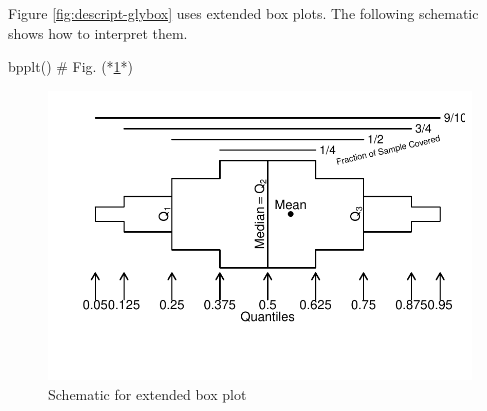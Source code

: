 Figure \ref{fig:descript-glybox} uses extended box plots.  The
following schematic shows how to interpret them.
\begin{Schunk}
\begin{Sinput}
bpplt()   # Fig. (*\ref{fig:descript-bpplt}*)
\end{Sinput}
\begin{figure}[htbp]

\centerline{\includegraphics[width=\maxwidth]{descript-bpplt-1} }

\caption[Schematic for extended box plot]{Schematic for extended box plot}\label{fig:descript-bpplt}
\end{figure}
\end{Schunk}

